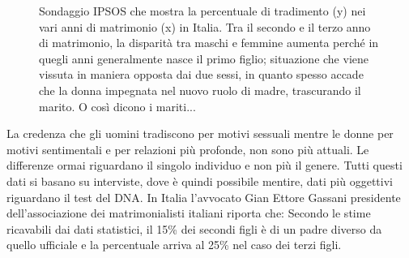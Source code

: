 \documentclass[12pt]{book} %
\begin{document}
\begin{figure}[H]
  \centering
  \caption{Sondaggio IPSOS che mostra la percentuale di tradimento (y) nei vari anni di matrimonio (x) in Italia. Tra il secondo e il terzo anno di matrimonio, la disparità tra maschi e femmine aumenta perché in quegli anni generalmente nasce il primo figlio; situazione che viene vissuta in maniera opposta dai due sessi, in quanto spesso accade che la donna impegnata nel nuovo ruolo di madre, trascurando il marito. O così dicono i mariti...}
\end{figure}

La credenza che gli uomini tradiscono per motivi sessuali mentre le donne per motivi sentimentali e per relazioni più
profonde, non sono più attuali. Le differenze ormai riguardano il singolo individuo e non più il genere. Tutti questi
dati si basano su interviste, dove è quindi possibile mentire, dati più oggettivi riguardano il test del DNA. In Italia
l'avvocato Gian Ettore Gassani presidente dell'associazione dei
matrimonialisti italiani riporta che: Secondo le stime ricavabili dai dati statistici, il 15\% dei secondi figli è di
un padre diverso da quello ufficiale e la percentuale arriva al 25\% nel caso dei terzi figli.
\end{document}

